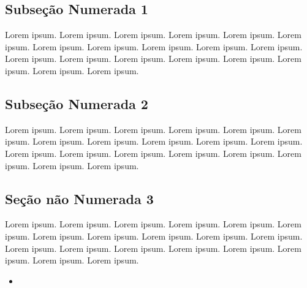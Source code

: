 \documentclass[
]{book}
\providecommand{\tightlist}{%
  \setlength{\itemsep}{0pt}\setlength{\parskip}{0pt}}
\begin{document}
\hypertarget{subseuxe7uxe3o-numerada-1-3}{%
\subsection{Subseção Numerada 1}\label{subseuxe7uxe3o-numerada-1-3}}

Lorem ipsum. Lorem ipsum. Lorem ipsum. Lorem ipsum. Lorem ipsum. Lorem ipsum. Lorem ipsum. Lorem ipsum. Lorem ipsum. Lorem ipsum. Lorem ipsum. Lorem ipsum. Lorem ipsum. Lorem ipsum. Lorem ipsum. Lorem ipsum. Lorem ipsum. Lorem ipsum. Lorem ipsum.

\hypertarget{subseuxe7uxe3o-numerada-2-3}{%
\subsection{Subseção Numerada 2}\label{subseuxe7uxe3o-numerada-2-3}}

Lorem ipsum. Lorem ipsum. Lorem ipsum. Lorem ipsum. Lorem ipsum. Lorem ipsum. Lorem ipsum. Lorem ipsum. Lorem ipsum. Lorem ipsum. Lorem ipsum. Lorem ipsum. Lorem ipsum. Lorem ipsum. Lorem ipsum. Lorem ipsum. Lorem ipsum. Lorem ipsum. Lorem ipsum.

\hypertarget{seuxe7uxe3o-nuxe3o-numerada-3-3}{%
\subsection*{Seção não Numerada 3}\label{seuxe7uxe3o-nuxe3o-numerada-3-3}}

Lorem ipsum. Lorem ipsum. Lorem ipsum. Lorem ipsum. Lorem ipsum. Lorem ipsum. Lorem ipsum. Lorem ipsum. Lorem ipsum. Lorem ipsum. Lorem ipsum. Lorem ipsum. Lorem ipsum. Lorem ipsum. Lorem ipsum. Lorem ipsum. Lorem ipsum. Lorem ipsum. Lorem ipsum.

\begin{itemize}
\tightlist
\item
\end{itemize}

  
\end{document}

